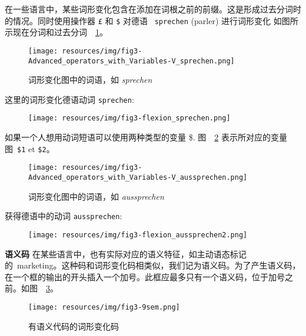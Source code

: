 \noindent 在一些语言中，某些词形变化包含在添加在词根之前的前缀。这是形成过去分词时的情况。同时使用操作器 \verb+£+ 和 \verb+$+ 对德语 \ \verb+sprechen+ (parler) 进行词形变化
如图所示现在分词和过去分词\ ~\ref{fig-inflection-sprechen}。

\newpage
\begin{figure}[!htbp]
\begin{center}
\texttt{[image: resources/img/fig3-Advanced\_operators\_with\_Variables-V\_sprechen.png]}
\caption{词形变化图中的词语，如 {\it sprechen}
\label{fig-inflection-sprechen}}
\end{center}
\end{figure}

\noindent 这里的词形变化德语动词 \verb+sprechen+:

\bigskip
\begin{figure}[!ht]
\begin{center}
\texttt{[image: resources/img/fig3-flexion\_sprechen.png]}
\end{center}
\end{figure}

\noindent 如果一个人想用动词短语可以使用两种类型的变量 \$.
图\ ~\ref{fig-inflection-aussprechen} 表示所对应的变量图\ \verb+$1+ et \verb+$2+。

\bigskip
\begin{figure}[!ht]
\begin{center}
\texttt{[image: resources/img/fig3-Advanced\_operators\_with\_Variables-V\_aussprechen.png]}
\caption{词形变化图中的词语，如 {\it aussprechen}
\label{fig-inflection-aussprechen}}
\end{center}
\end{figure}

\noindent 获得德语中的动词 \verb+aussprechen+:
\bigskip
\begin{figure}[!ht]
\begin{center}
\texttt{[image: resources/img/fig3-flexion\_aussprechen2.png]}
\end{center}
\end{figure}

\bigskip
\noindent \textbf{语义码}
\noindent 在某些语言中，也有实际对应的语义特征，如主动语态标记的\ marketing。这种码和词形变化码相类似，我们记为语义码。为了产生语义码，在一个框的输出的开头插入一个加号。此框应最多只有一个语义码，位于加号之前。如图\ ~\ref{fig-inflection-sem}。

\bigskip
\begin{figure}[!ht]
\begin{center}
\texttt{[image: resources/img/fig3-9sem.png]}
\caption{有语义代码的词形变化码\label{fig-inflection-sem}}
\end{center}
\end{figure}

